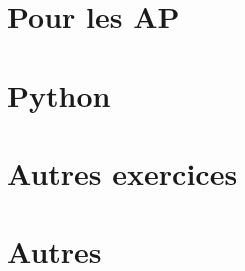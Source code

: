 \documentclass[a4paper,12pt]{book}
\begin{document}
\part{Pour les AP}


\part{Python}



\part{Autres exercices}




\part{Autres}





   


\printindex
\end{document}
